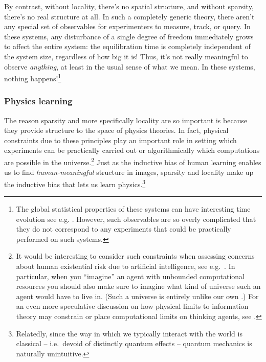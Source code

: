 \documentclass[12pt]{article}
\begin{document}
By contrast, without locality, there's no spatial structure, and without sparsity, there's no real structure at all. In such a completely generic theory, 
there aren't any special set of observables for experimenters to measure, track, or query.
In these systems, any disturbance of a single degree of freedom immediately grows to affect the entire system: the equilibration time is completely independent of the system size, regardless of how big it is! 
Thus, %
it's not really meaningful to observe \emph{anything}, at least in the usual sense of what we mean. In these systems, nothing happens!\footnote{The global statistical properties of these systems can have interesting time evolution see e.g. \cite{Cotler:2016fpe}. However, such observables are so overly complicated that they do not correspond to any experiments that %
could be practically performed on such systems.
} 

\subsubsection*{Physics learning}

The reason sparsity and more specifically locality are so important is because they provide structure to the space of physics theories. In fact, physical constraints due to these principles play an important role in setting which experiments can be practically carried out or algorithmically which computations are possible in the universe.\footnote{
It would be interesting to consider such constraints when assessing concerns about human existential risk due to artificial intelligence, see e.g.~\cite{bostrom2014superintelligence}.  In particular, when you ``imagine'' an agent with unbounded computational resources you should also make sure to imagine what kind of universe such an agent would have to live in. (Such a universe is entirely unlike our own \cite{Bekenstein:1980jp,tHooft:1993gx,Susskind:1994vu,Sekino:2008he,Shenker:2013pqa,Maldacena:2015waa,Brown:2015bva,Brown:2015lvg}.) For an even more speculative discussion on how physical limits to information theory may constrain or place computational limits on thinking agents, see \cite{roberts2018causality}.
}
Just as the inductive bias of human learning enables us to find \emph{human-meaningful} structure in images, sparsity and locality make up the inductive bias that lets us learn physics.\footnote{
Relatedly, since the way in which we typically interact with the world is classical -- i.e.~devoid of distinctly quantum effects -- quantum mechanics is naturally unintuitive.}  
\end{document}
